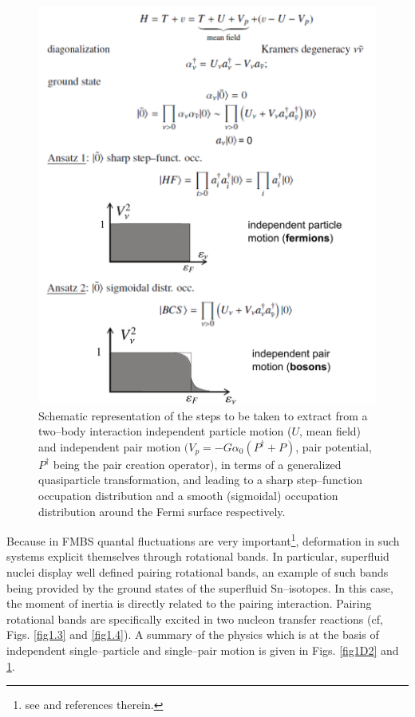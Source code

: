 \begin{figure}\centerline{\includegraphics*[width=\textwidth,angle=0]{nutshell/figs/fig1D3.pdf}}
\caption{Schematic representation of the steps to be taken to extract from a two--body interaction independent particle motion ($U$, mean field) and independent pair motion $(V_p=-G\alpha_0(P^\dagger+P)$, pair potential, $P^\dagger$ being the pair creation operator), in terms of a generalized quasiparticle transformation, and leading to a sharp step--function occupation distribution and a smooth (sigmoidal) occupation distribution around the Fermi surface respectively.}\label{fig1D3}
\end{figure}




Because in FMBS  quantal fluctuations are very important\footnote{see \cite{Bertsch:05} and references therein.}, deformation in such systems explicit themselves through rotational bands. In particular, superfluid nuclei display well defined pairing rotational bands, an example of such bands being provided by the ground states of the superfluid Sn--isotopes. In this case, the moment of inertia is directly related to the  pairing interaction. Pairing  rotational bands are specifically excited in two nucleon transfer reactions (cf, Figs. \ref{fig1.3} and \ref{fig1.4}). 
A summary of the physics which is at the basis of independent single--particle and single--pair motion is given in Figs. \ref{fig1D2} and \ref{fig1D3}. 







